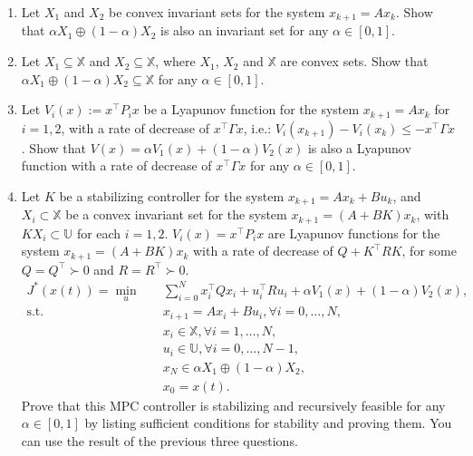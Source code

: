 \begin{enumerate}
    \item Let $X_1$ and $X_2$ be convex invariant sets for the system $x_{k+1}= Ax_k$. Show that $\alpha X_1\oplus (1-\alpha)X_2$ is also an invariant set for any $\alpha \in [0,1]$.\vspace{5\baselineskip}
    \item Let $X_1\subseteq\mathbb{X}$ and $X_2\subseteq\mathbb{X}$, where $X_1$, $X_2$ and $\mathbb{X}$ are convex sets. Show that $\alpha X_1\oplus (1-\alpha)X_2\subseteq \mathbb{X}$ for any $\alpha \in [0,1]$.\vspace{5\baselineskip}
    \item Let $V_i(x):= x^{\top}P_ix$ be a Lyapunov function for the system $x_{k+1} = Ax_k$ for $i = 1,2$, with a rate of decrease of $x^{\top}\Gamma x$, i.e.: $V_i(x_{k+1})-V_i(x_k)\leq -x^{\top}\Gamma x$. Show that $V(x) = \alpha V_1(x)+(1-\alpha)V_2(x)$ is also a Lyapunov function with a rate of decrease of $x^{\top}\Gamma x$ for any $\alpha \in [0,1]$.\vspace{5\baselineskip}
    \item Let $K$ be a stabilizing controller for the system $x_{k+1} = Ax_k + Bu_k$, and $X_i\subset \mathbb{X}$ be a convex invariant set for the system $x_{k+1} = (A+BK)x_k$, with $KX_i\subset \mathbb{U}$ for each $i = 1,2$. $V_i(x) = x^{\top}P_ix$ are Lyapunov functions for the system $x_{k+1} = (A+BK)x_k$ with a rate of decrease of $Q+K^{\top}RK$, for some $Q = Q^{\top}\succ 0$ and $R = R^{\top} \succ 0$.
    \begin{align*}
        J^*(x(t)) = \min_u \quad&\sum_{i=0}^{N} x_i^{\top}Qx_i + u_i^{\top}Ru_i + \alpha V_1(x) + (1-\alpha)V_2(x),\\
        \text{s.t.}\quad & x_{i+1} = Ax_i + Bu_i, \forall i  = 0,\hdots, N,\\
        &x_i \in \mathbb{X},\forall i  = 1,\hdots, N,\\
        &u_i \in \mathbb{U},\forall i  = 0,\hdots, N-1,\\
        &x_N \in \alpha X_1 \oplus (1-\alpha)X_2,\\
        &x_0 = x(t).
    \end{align*}
    Prove that this MPC controller is stabilizing and recursively feasible for any $\alpha \in [0,1]$ by listing sufficient conditions for stability and proving them. You can use the result of the previous three questions.
\end{enumerate}
